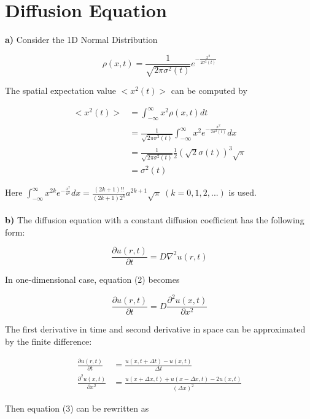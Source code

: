 \documentclass{article}
\begin{document}
\section{Diffusion Equation}
\textbf{a)} Consider the 1D Normal Distribution

\begin{equation}
\rho(x,t) = \frac{1}{\sqrt{2\pi \sigma^2 (t)}} e^{-\frac{x^2}{2\sigma^2(t)}}
\end{equation}

The spatial expectation value $<x^2(t)>$ can be computed by

\begin{align*}
<x^2(t)> & = \int_{-\infty}^{\infty} x^2 \rho(x,t) dt \\
& = \frac{1}{\sqrt{2\pi \sigma^2 (t)}} \int_{-\infty}^{\infty} x^2 e^{-\frac{x^2}{2\sigma^2(t)}} dx \\
& = \frac{1}{\sqrt{2\pi \sigma^2 (t)}} \frac{1}{2} (\sqrt{2} \sigma(t))^3 \sqrt{\pi} \\
& = \sigma^2 (t)
\end{align*}

Here $\int_{-\infty}^{\infty} x^{2k} e^{-\frac{x^2}{a^2}} dx = \frac{(2k+1)!!}{(2k+1)2^k} a^{2k+1} \sqrt{\pi}\ (k=0,1,2,...)$ is used.\\
\\
\textbf{b)} The diffusion equation with a constant diffusion coefficient has the following form:

\begin{equation}
\frac{\partial u (r,t)}{\partial t} = D \nabla^2 u(r,t)
\end{equation}

In one-dimensional case, equation (2) becomes

\begin{equation}
\frac{\partial u (r,t)}{\partial t} = D \frac{\partial^2 u(x,t)}{\partial x^2}
\end{equation}

The first derivative in time and second derivative in space can be approximated by the finite difference:

\begin{align*}
\frac{\partial u (r,t)}{\partial t} & = \frac{u(x,t+\Delta t) - u(x,t)}{\Delta t} \\
\frac{\partial^2 u(x,t)}{\partial x^2} & = \frac{u(x+\Delta x,t)+u(x-\Delta x,t)-2u(x,t)}{(\Delta x)^2}
\end{align*}

Then equation (3) can be rewritten as
\end{document}
